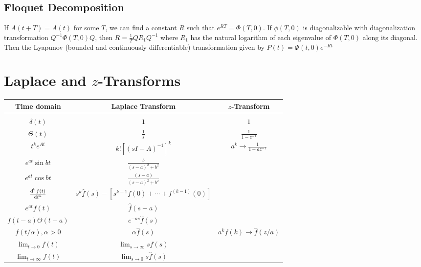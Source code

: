 \documentclass{report}
\begin{document}
\subsection{Floquet Decomposition}
If $A(t + T) = A(t)$ for some $T$, we can find a constant $R$ such
that $e^{RT} = \Phi(T, 0)$. If $\phi(T, 0)$ is diagonalizable with
diagonalization transformation $Q^{-1} \Phi(T, 0) Q$, then
$R = \frac{1}{T} Q R_1 Q^{-1}$ where $R_1$ has the natural logarithm
of each eigenvalue of $\Phi(T, 0)$ along its diagonal. Then the
Lyapunov (bounded and continuously differentiable) transformation
given by $P(t) = \Phi(t,0)e^{-Rt}$

\section{Laplace and $z$-Transforms}

\begin{tabular}{c | c | c}
  Time domain                   & Laplace Transform    & $z$-Transform \\
  \hline  \\
  $\delta(t)$                   & $1$                           & $1$ \\
  $\Theta(t)$                   & $\frac{1}{s}$                 & $\frac{1}{1 - z^{-1}}$ \\
  $t^k e^{At}$                   & $k! [(sI - A)^{-1}]^k$         & $a^k \to \frac{1}{1 - az^{-1}}$ \\
  $e^{at} \sin bt$               & $\frac{b}{(s-a)^2 + b^2}$     & \\
  $e^{at} \cos bt$               & $\frac{(s-a)}{(s-a)^2 + b^2}$ & \\
  $\frac{\dif^k f(t)}{\dif t^k}$ & $s^k \hat{f}(s)
                                 - [s^{k-1} f(0) + \cdots + f^{(k-1)}(0)]$ & \\
  $e^{at} f(t)$                  & $\hat{f}(s - a)$               & \\
  $f(t - a)\Theta(t - a)$       & $e^{-as} \hat{f}(s)$            & \\
  $f(t / \alpha), \alpha > 0$   & $\alpha \hat{f}(s)$            & $a^k f(k) \to \hat{f}(z / a)$\\
  $\lim_{t \to 0} f(t)$           & $\lim_{s \to \infty} s\hat{f}(s)$ & \\
  $\lim_{t \to \infty} f(t)$       & $\lim_{s \to 0} s\hat{f}(s)$     &
\end{tabular}
\end{document}
